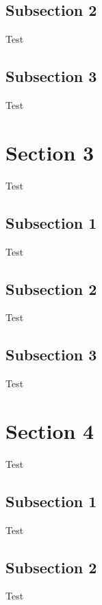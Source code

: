 \documentclass[compress,14pt,t]{beamer}
\begin{document}
    \subsection{Subsection 2}
    \begin{frame}Test\end{frame}
    \subsection{Subsection 3}
    \begin{frame}Test\end{frame}

    \section{Section 3}
    \begin{frame}Test\end{frame}
    \subsection{Subsection 1}
    \begin{frame}Test\end{frame}
    \subsection{Subsection 2}
    \begin{frame}Test\end{frame}
    \subsection{Subsection 3}
    \begin{frame}Test\end{frame}

    \section{Section 4}
    \begin{frame}Test\end{frame}
    \subsection{Subsection 1}
    \begin{frame}Test\end{frame}
    \subsection{Subsection 2}
    \begin{frame}Test\end{frame}
\end{document}
